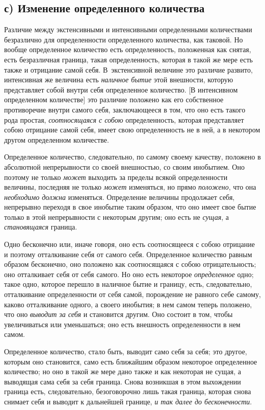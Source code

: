 \subsection[с) Изменение определенного количества]{с) Изменение
определенного количества}
Различие между экстенсивными и интенсивными определенными количествами
безразлично для определенности определенного количества, как таковой. Но
вообще определенное количество есть определенность, положенная как снятая,
есть безразличная граница, такая определенность, которая в такой же мере
есть также и отрицание самой себя. В~экстенсивной величине это различие
развито, интенсивная же величина есть {\em наличное
бытие} этой внешности, которую представляет собой внутри себя определенное
количество. [В интенсивном определенном количестве] это различие положено
как его собственное противоречие внутри самого себя, заключающееся в том,
что оно есть такого рода простая, {\em соотносящаяся с
собою} определенность, которая представляет собою отрицание самой себя,
имеет свою определенность не в ней, а в некотором другом определенном
количестве.

Определенное количество, следовательно, по самому своему качеству, положено
в абсолютной непрерывности со своей внешностью, со своим инобытием. Оно
поэтому не только {\em может} выходить за пределы
всякой определенности величины, последняя не только
{\em может} изменяться, но прямо
{\em положено}, что она
{\em необходимо должна} изменяться. Определение
величины продолжает себя, непрерывно переходя в свое инобытие таким
образом, что оно имеет свое бытие только в этой непрерывности с некоторым
другим; оно есть не {\em сущая}, а
{\em становящаяся} граница.

Одно бесконечно или, иначе говоря, оно есть соотносящееся с собою отрицание
и поэтому отталкивание себя от самого себя. Определенное количество равным
образом бесконечно, оно положено как соотносящаяся с собою отрицательность;
оно отталкивает себя от себя самого. Но оно есть некоторое
{\em определенное} одно; такое одно, которое перешло в
наличное бытие и границу, есть, следовательно, отталкивание определенности
от себя самой, порождение не равного себе самому, каково отталкивание
одного, а своего инобытия; в нем самом теперь положено, что оно
{\em выводит за себя} и становится другим. Оно состоит
в том, чтобы увеличиваться или уменьшаться; оно есть внешность
определенности в нем самом.

Определенное количество, стало быть, выводит само себя за себя; это другое,
которым оно становится, само есть ближайшим образом некоторое определенное
количество; но оно в такой же мере дано также и как некоторая не сущая, а
выводящая сама себя за себя граница. Снова возникшая в этом выхождении
граница есть, следовательно, безоговорочно лишь такая граница, которая
снова снимает себя и выводит к дальнейшей границе,
{\em и так далее до бесконечности}.


